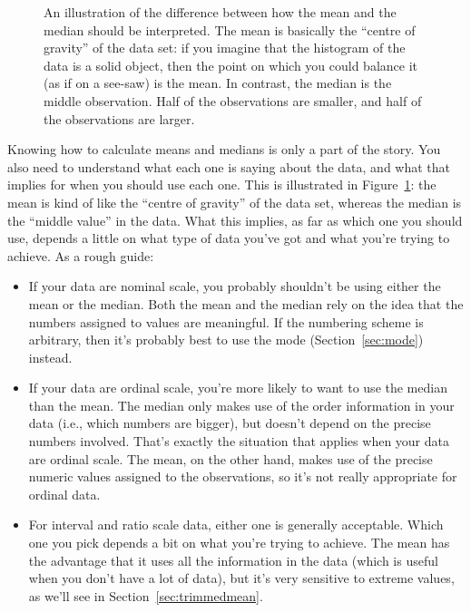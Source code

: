 
\begin{figure}
\begin{center}
\caption{An illustration of the difference between how the mean and the median should be interpreted. The mean is basically the ``centre of gravity'' of the data set: if you imagine that the histogram of the data is a solid object, then the point on which you could balance it (as if on a see-saw) is the mean. In contrast, the median is the middle observation. Half of the observations are smaller, and half of the observations are larger.}
\HR
\label{fig:meanmedian}
\end{center}
\end{figure}

Knowing how to calculate means and medians is only a part of the story. You also need to understand what each one is saying about the data, and what that implies for when you should use each one. This is illustrated in Figure~\ref{fig:meanmedian}: the mean is kind of like the ``centre of gravity'' of the data set, whereas the median is the ``middle value'' in the data. What this implies, as far as which one you should use, depends a little on what type of data you've got and what you're trying to achieve. As a rough guide:
\begin{itemize} 
\item If your data are nominal scale, you probably shouldn't be using either the mean or the median. Both the mean and the median rely on the idea that the numbers assigned to values are meaningful. If the numbering scheme is arbitrary, then it's probably best to use the mode (Section~\ref{sec:mode}) instead. 
\item If your data are ordinal scale, you're more likely to want to use the median than the mean. The median only makes use of the order information in your data (i.e., which numbers are bigger), but doesn't depend on the precise numbers involved. That's exactly the situation that applies when your data are ordinal scale. The mean, on the other hand, makes use of the precise numeric values assigned to the observations, so it's not really appropriate for ordinal data.
\item For interval and ratio scale data, either one is generally acceptable. Which one you pick depends a bit on what you're trying to achieve. The mean has the advantage that it uses all the information in the data (which is useful when you don't have a lot of data), but it's very sensitive to extreme values, as we'll see in Section~\ref{sec:trimmedmean}.  
\end{itemize}

